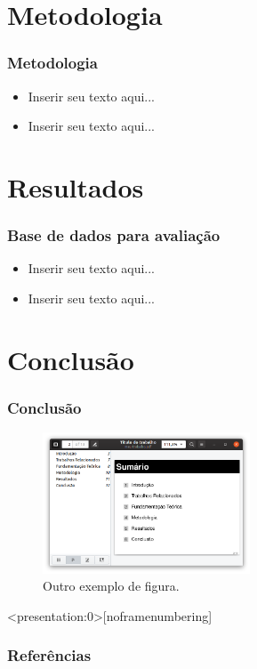 \documentclass[aspectratio=34, 14pt]{latex-slides}
\begin{document}
    \section{Metodologia}
    \begin{frame}
        \frametitle{Metodologia}

        \begin{itemize}
            \item Inserir seu texto aqui...
            \item Inserir seu texto aqui...
        \end{itemize}
    \end{frame}

    \section{Resultados}
    \begin{frame}
        \frametitle{Base de dados para avaliação}

        \begin{itemize}
            \item Inserir seu texto aqui...
            \item Inserir seu texto aqui...
        \end{itemize}
    \end{frame}

    \section{Conclusão}
    \begin{frame}
        \frametitle{Conclusão}

        \setcounter{figure}{3}
        \begin{figure}[!t]
            \centering
            \includegraphics[width=0.55\textwidth]{./figuras/figura-exemplo2}
            \caption{Outro exemplo de figura.}
            \label{fig:outro_exemplo_figura}
        \end{figure}
    \end{frame}

    \begin{frame}<presentation:0>[noframenumbering] %
        \frametitle{Referências}

        \small
        
    \end{frame}

    \begin{frame}
        \titlepage
    \end{frame}
\end{document}
